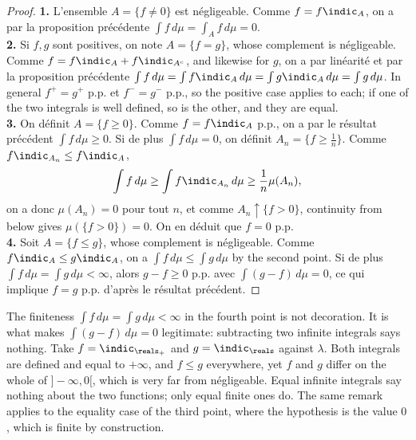 \begin{proof}
  \textbf{1.} L'ensemble $A = \{f \neq 0\}$ est négligeable. Comme $f = f
  \indic_{A}$, on a par la proposition précédente $\int f \, d\mu = \int_{A} f \,
  d\mu = 0$.\\

  \textbf{2.} Si $f, g$ sont positives, on note $A = \{f = g\}$, whose complement is
  négligeable. Comme $f = f \indic_{A} + f \indic_{A^{c}}$, and likewise for $g$, on
  a par linéarité et par la proposition précédente $\int f \, d\mu = \int f
  \indic_{A} \, d\mu = \int g \indic_{A} \, d\mu = \int g \, d\mu$. In general $f^{+}
  = g^{+}$ p.p. et $f^{-} = g^{-}$ p.p., so the positive case applies to each; if
  one of the two integrals is well defined, so is the other, and they are equal.\\

  \textbf{3.} On définit $A = \{f \geq 0\}$. Comme $f = f \indic_{A}$ p.p., on a par
  le résultat précédent $\int f \, d\mu \geq 0$. Si de plus $\int f \, d\mu = 0$, on
  définit $A_{n} = \{f \geq \frac{1}{n}\}$. Comme $f \indic_{A_{n}} \leq f
  \indic_{A}$,
  \[
    \int f \, d\mu \geq \int f \indic_{A_{n}} \, d\mu
    \geq \frac{1}{n} \mu(A_{n}) ,
  \]
  on a donc $\mu(A_{n}) = 0$ pour tout $n$, et comme $A_{n} \uparrow \{f > 0\}$,
  continuity from below gives $\mu(\{f > 0\}) = 0$. On en déduit que $f = 0$ p.p.\\

  \textbf{4.} Soit $A = \{f \leq g\}$, whose complement is négligeable. Comme $f
  \indic_{A} \leq g \indic_{A}$, on a $\int f \, d\mu \leq \int g \, d\mu$ by the
  second point. Si de plus $\int f \, d\mu = \int g \, d\mu < \infty$, alors $g - f
  \geq 0$ p.p. avec $\int (g-f) \, d\mu = 0$, ce qui implique $f = g$ p.p. d'après le
  résultat précédent.
\end{proof}

\begin{remark}
  The finiteness $\int f \, d\mu = \int g \, d\mu < \infty$ in the fourth point is
  not decoration. It is what makes $\int (g-f) \, d\mu = 0$ legitimate: subtracting
  two infinite integrals says nothing. Take $f = \indic_{\reals_{+}}$ and $g =
  \indic_{\reals}$ against $\lambda$. Both integrals are defined and equal to
  $+\infty$, and $f \leq g$ everywhere, yet $f$ and $g$ differ on the whole of
  $]-\infty,0[$, which is very far from négligeable. Equal infinite integrals say
  nothing about the two functions; only equal finite ones do. The same remark applies
  to the equality case of the third point, where the hypothesis is the value $0$,
  which is finite by construction.
\end{remark}

